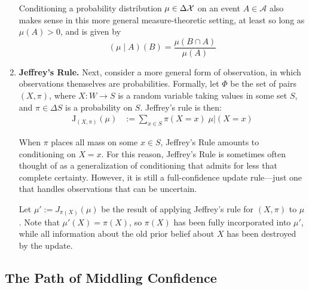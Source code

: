 \begin{enumerate}[wide, label=\textbf{\thesubsection.\arabic*}]
{	Conditioning a probability distribution $\mu \in \Delta\mathcal X$ on an event $A \in \mathcal A$ also makes sense in this more general measure-theoretic setting, at least so long as $\mu(A) > 0$, and is given by
	$$
		(\mu \mid A) (B) = \frac{\mu(B \cap A)}{\mu(A)}
	$$
	}


	\item
	\textbf{Jeffrey's Rule.}
	Next, consider a more general form of observation, in which observations themselves are probabilities.
	Formally, let $\Phi$ be the set of pairs $(X,\pi)$,
	where $X : W \to S$ is a random variable taking values in some set $S$,
	and $\pi \in \Delta S$ is a probability on
	$S$.
	Jeffrey's rule is then:
	\begin{align*}
		\mathrm{J}_{(X,\pi)}
		(\mu) &:= \sum_{x \in S} \pi(X{=}x) \;  \mu \big|
            (X{=}x)
	\end{align*}

	When $\pi$ places all mass on some $x \in S$, Jeffrey's Rule amounts to conditioning on $X {=} x$.
	For this reason, Jeffrey's Rule is sometimes often thought of as a generalization of conditioning that admits for less that complete certainty.
	However, it is still a full-confidence update rule---just one that handles observations that can be uncertain.

	Let $\mu' := J_{\pi(X)}(\mu)$ be the result of applying Jeffrey's rule for $(X,\pi)$ to $\mu$.
	Note that $\mu'(X) = \pi(X)$, so $\pi(X)$ has been fully incorporated into $\mu'$, while all information about the old prior belief about $X$ has been destroyed by the update.
\end{enumerate}


\subsection{The Path of Middling Confidence}

